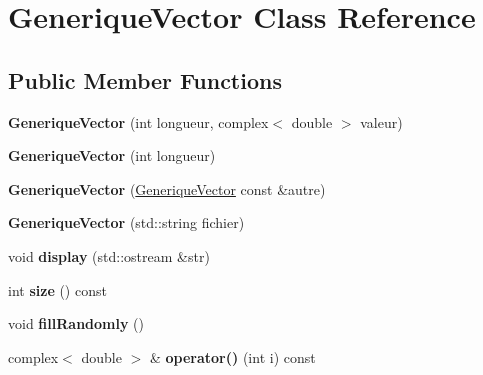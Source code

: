 \hypertarget{classGeneriqueVector}{\section{Generique\-Vector Class Reference}
\label{classGeneriqueVector}
}
\subsection*{Public Member Functions}
\begin{DoxyCompactItemize}
\item 
\hypertarget{classGeneriqueVector_a4dd110ae197c2f68233266280baa83aa}{{\bfseries Generique\-Vector} (int longueur, complex$<$ double $>$ valeur)}\label{classGeneriqueVector_a4dd110ae197c2f68233266280baa83aa}

\item 
\hypertarget{classGeneriqueVector_a65a61d5fe5417c4f6f1b6c451e135b7d}{{\bfseries Generique\-Vector} (int longueur)}\label{classGeneriqueVector_a65a61d5fe5417c4f6f1b6c451e135b7d}

\item 
\hypertarget{classGeneriqueVector_ac29c1fdc8e327dbb67a65dfeca012662}{{\bfseries Generique\-Vector} (\hyperlink{classGeneriqueVector}{Generique\-Vector} const \&autre)}\label{classGeneriqueVector_ac29c1fdc8e327dbb67a65dfeca012662}

\item 
\hypertarget{classGeneriqueVector_a5997fb9313f0161e5e5800be7df7a30e}{{\bfseries Generique\-Vector} (std\-::string fichier)}\label{classGeneriqueVector_a5997fb9313f0161e5e5800be7df7a30e}

\item 
\hypertarget{classGeneriqueVector_aee3879b6808f286ae00a21d569a4b2bf}{void {\bfseries display} (std\-::ostream \&str)}\label{classGeneriqueVector_aee3879b6808f286ae00a21d569a4b2bf}

\item 
\hypertarget{classGeneriqueVector_abcc638ba83b96e2a00e214584c0ac89b}{int {\bfseries size} () const }\label{classGeneriqueVector_abcc638ba83b96e2a00e214584c0ac89b}

\item 
\hypertarget{classGeneriqueVector_afd76e7455f9f55d5f5feabcd7261cc6e}{void {\bfseries fill\-Randomly} ()}\label{classGeneriqueVector_afd76e7455f9f55d5f5feabcd7261cc6e}

\item 
\hypertarget{classGeneriqueVector_af022ad2aa4c21bf3d18eb1fdc1c4e9d0}{complex$<$ double $>$ \& {\bfseries operator()} (int i) const }\label{classGeneriqueVector_af022ad2aa4c21bf3d18eb1fdc1c4e9d0}


\end{DoxyCompactItemize}
